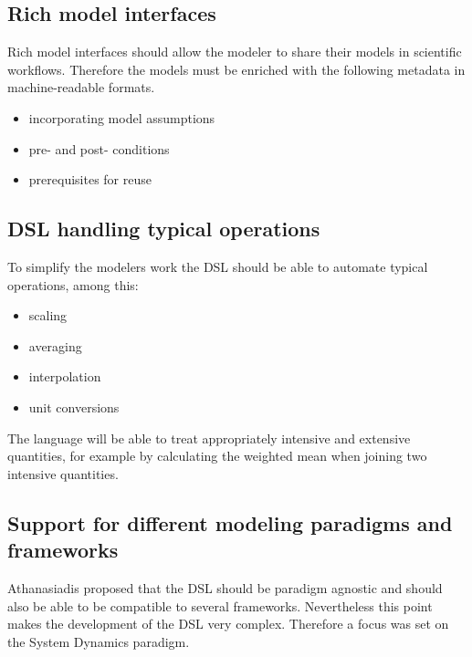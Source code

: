 \subsection{Rich model interfaces}
\par
Rich model interfaces should allow the modeler to share their models in scientific workflows. Therefore the models must be enriched with the following metadata in machine-readable formats.
\begin{itemize}
	\item incorporating model assumptions
	\item pre- and post- conditions
	\item prerequisites for reuse
\end{itemize}

\subsection{DSL handling typical operations}
\par
To simplify the modelers work the DSL should be able to automate typical operations, among this:
\begin{itemize}
	\item scaling
	\item averaging
	\item interpolation
	\item unit conversions
\end{itemize}
\par
The language will be able to treat appropriately intensive and extensive quantities, for example by calculating the weighted mean when joining two intensive quantities.

\subsection{Support for different modeling paradigms and frameworks}
\par
Athanasiadis proposed that the DSL should be paradigm agnostic and should also be able to be compatible to several frameworks. Nevertheless this point makes the development of the DSL very complex. Therefore a focus was set on the System Dynamics paradigm.

